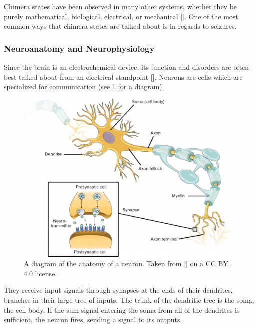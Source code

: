 Chimera states have been observed in many other systems, whether they be purely mathematical, biological, electrical, or mechanical [].
One of the most common ways that chimera states are talked about is in regards to seizures.

\subsubsection{Neuroanatomy and Neurophysiology}
\label{sec:intro_seizures_neuroanatomy}
Since the brain is an electrochemical device, its function and disorders are often best talked about from an electrical standpoint [].
Neurons are cells which are specialized for communication (see \cref{fig:neuron_diagram} for a diagram).
\begin{figure}[ht]
  \centering
  \includegraphics[width=0.8\columnwidth]{figure/neuron_diagram.pdf}
  \caption[Neuron diagram]{A diagram of the anatomy of a neuron.
    Taken from [] on a \href{https://creativecommons.org/licenses/by/4.0/}{CC BY 4.0 license}.
  }
  \label{fig:neuron_diagram}
\end{figure}
They receive input signals through synapses at the ends of their dendrites, branches in their large tree of inputs.
The trunk of the dendritic tree is the soma, the cell body.
If the sum signal entering the soma from all of the dendrites is sufficient, the neuron fires, sending a signal to its outputs.

